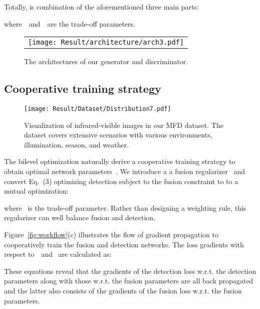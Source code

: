 \documentclass[10pt,twocolumn,letterpaper]{article}
\begin{document}
Totally,  is combination of the aforementioned three main parts: 
\vspace{-0.5cm} 

where~~and~~are the trade-off parameters.
\vspace{-0.2cm} 
\begin{figure}[!htb]
	\centering
	\setlength{\tabcolsep}{1pt}
	\begin{tabular}{c}
		
		\texttt{[image: Result/architecture/arch3.pdf]}
		\\ 				
	\end{tabular}
	\vspace{-0.3cm}
	\caption{The architectures of our generator and discriminator.}
	\label{fig:arch}
\end{figure}
\vspace{-0.6cm} 
\subsection{Cooperative training strategy}
\begin{figure*}[!htb]
	\centering
	\setlength{\tabcolsep}{1pt} 
	
	\texttt{[image: Result/Dataset/Distribution7.pdf]}
	
	\caption{Visualization of infrared-visible images in our MFD dataset. The dataset covers extensive scenarios with various environments, illumination, season, and weather.}
	\label{fig:sample}
	\vspace{-0.5cm}  
\end{figure*}
The bilevel optimization naturally derive a cooperative training strategy to obtain  optimal network parameters~. We introduce a a fusion regularizer~ and convert Eq.~(3) optimizing detection subject to the fusion constraint to to a mutual optimization: 
\vspace{-0.2cm} 

where~ is the trade-off parameter. Rather than designing a weighting rule, this regularizer can well balance fusion and detection.

Figure~\ref{fig:workflow}(c) illustrates the flow of gradient propagation to cooperatively train the fusion and detection networks. The loss gradients with respect to~~and~ are calculated as:

These equations reveal that the gradients of the detection loss w.r.t. the detection parameters along with those w.r.t. the fusion parameters are all back propagated and the latter also consists of the gradients of the fusion loss w.r.t. the fusion parameters.
\end{document}
